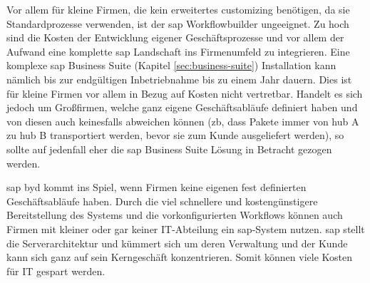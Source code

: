 
Vor allem für kleine Firmen, die kein erweitertes \gls{customizing} benötigen, da sie Standardprozesse verwenden, ist der \gls{sap} Workflowbuilder ungeeignet. Zu hoch sind die Kosten der Entwicklung eigener Geschäftsprozesse und vor allem der Aufwand eine komplette \gls{sap} Landschaft ins Firmenumfeld zu integrieren. Eine komplexe \gls{sap} Business Suite (Kapitel \ref{sec:business-suite}) Installation kann nämlich bis zur endgültigen Inbetriebnahme bis zu einem Jahr dauern. Dies ist für kleine Firmen vor allem in Bezug auf Kosten nicht vertretbar. Handelt es sich jedoch um Großfirmen, welche ganz eigene Geschäftsabläufe definiert haben und von diesen auch keinesfalls abweichen können (\gls{zb}, dass Pakete immer von \gls{hub} A zu \gls{hub} B transportiert werden, bevor sie zum Kunde ausgeliefert werden), so sollte auf jedenfall eher die \gls{sap} Business Suite Lösung in Betracht gezogen werden.

\gls{sap} \gls{byd} kommt ins Spiel, wenn Firmen keine eigenen fest definierten Geschäftsabläufe haben. Durch die viel schnellere und kostengünstigere Bereitstellung des Systems und die vorkonfigurierten Workflows können auch Firmen mit kleiner oder gar keiner IT-Abteilung ein \gls{sap}-System nutzen. \gls{sap} stellt die Serverarchitektur und kümmert sich um deren Verwaltung und der Kunde kann sich ganz auf sein Kerngeschäft konzentrieren. Somit können viele Kosten für IT gespart werden.

